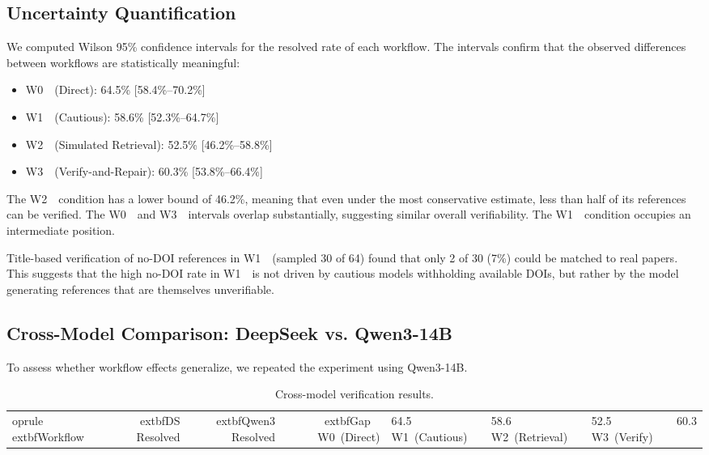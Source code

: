\documentclass[11pt,a4paper]{article}
\newcommand{\wzero}{W0~}
\newcommand{\wone}{W1~}
\newcommand{\wtwo}{W2~}
\newcommand{\wthree}{W3~}
\begin{document}
\subsection{Uncertainty Quantification}


We computed Wilson 95\% confidence intervals for the resolved rate of each workflow.
The intervals confirm that the observed differences between workflows are statistically meaningful:

\begin{itemize}[nosep]
    \item \wzero~(Direct): 64.5\% [58.4\%--70.2\%]
    \item \wone~(Cautious): 58.6\% [52.3\%--64.7\%]
    \item \wtwo~(Simulated Retrieval): 52.5\% [46.2\%--58.8\%]
    \item \wthree~(Verify-and-Repair): 60.3\% [53.8\%--66.4\%]
\end{itemize}

The \wtwo~condition has a lower bound of 46.2\%, meaning that even under the most conservative estimate, less than half of its references can be verified. The \wzero~and \wthree~intervals overlap substantially, suggesting similar overall verifiability. The \wone~condition occupies an intermediate position.

Title-based verification of no-DOI references in \wone~(sampled 30 of 64) found that only 2 of 30 (7\%) could be matched to real papers. This suggests that the high no-DOI rate in \wone~is not driven by cautious models withholding available DOIs, but rather by the model generating references that are themselves unverifiable.


\subsection{Cross-Model Comparison: DeepSeek vs. Qwen3-14B}

To assess whether workflow effects generalize, we repeated the experiment using Qwen3-14B.

\begin{table}[ht]
\centering
\begin{tabular}{lrrr}
	oprule
	extbf{Workflow} & 	extbf{DS Resolved} & 	extbf{Qwen3 Resolved} & 	extbf{Gap} \
\midrule
\wzero (Direct) & 64.5%
\wone (Cautious) & 58.6%
\wtwo (Retrieval) & 52.5%
\wthree (Verify) & 60.3%
\bottomrule
\end{tabular}
\caption{Cross-model verification results.}
\label{tab:crossmodel}
\end{table}
\end{document}
